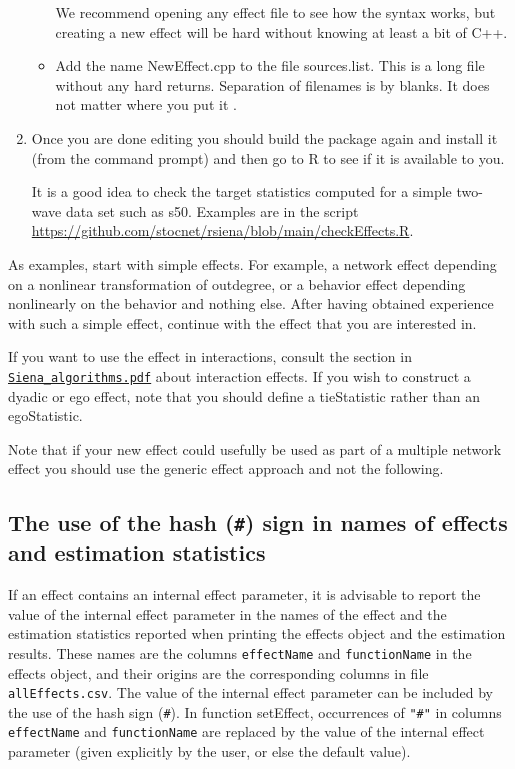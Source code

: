 \documentclass[a4paper,fleqn,11pt]{article}
\newcommand{\+}{\, + \,}
\newcommand{\sfn}[1]{\textsf{#1}}
\begin{document}
\begin{enumerate}
\begin{itemize}
                  We recommend opening any effect file to see
                  how the syntax works, but creating a new effect will be hard
                   without knowing at least a bit of C++.
            \item Add the name \textsf{NewEffect.cpp} to the file \textsf{sources.list}.
                  This is a long file without any hard returns.
                  Separation of filenames is by blanks.
                  It does not matter where you put it .
		\end{itemize}

		\item Once you are done editing you should build
the package again and install it (from the command prompt)
and then go to R to see if it is available to you.

It is a good idea to check the target statistics computed for a simple
two-wave data set such as \sfn{s50}.
Examples are in the script
\url{https://github.com/stocnet/rsiena/blob/main/checkEffects.R}.
\end{enumerate}

As examples, start with simple effects.
For example, a network effect depending on a nonlinear transformation
of outdegree, or a behavior effect depending nonlinearly
on the behavior and nothing else.
After having obtained experience with such a simple effect,
continue with the effect that you are interested in.
\medskip

If you want to use the effect in interactions, consult the section in
\href{http://www.stats.ox.ac.uk/~snijders/siena/Siena_algorithms.pdf}{\texttt{Siena\_algorithms.pdf}}
about interaction effects.
If you wish to construct a dyadic or ego effect, note that
you should define a \sfn{tieStatistic}
rather than an \sfn{egoStatistic}.
\medskip

Note that if your new effect could usefully be used as part of a multiple
network effect you should use the generic effect approach and not the following.

\subsection{The use of the hash (\texttt{\#}) sign
\protect \newline
in names of effects  and estimation statistics}
\label{S_hash}

If an effect contains an  internal effect parameter,
it is advisable to report the value of the internal effect parameter
in the names of the effect and the estimation statistics reported
when printing the effects object and the estimation results.
These names are the columns \texttt{effectName} and \texttt{functionName}
in the effects object, and their origins are the corresponding
columns in file \texttt{allEffects.csv}.
The value of the internal effect parameter can be included
by the use of the hash sign (\texttt{\#}).
In function \sfn{setEffect}, occurrences of \texttt{"\#"}
in columns \texttt{effectName} and \texttt{functionName}
are replaced by the value of the internal effect parameter
(given explicitly by the user, or else the default value).
\end{document}
